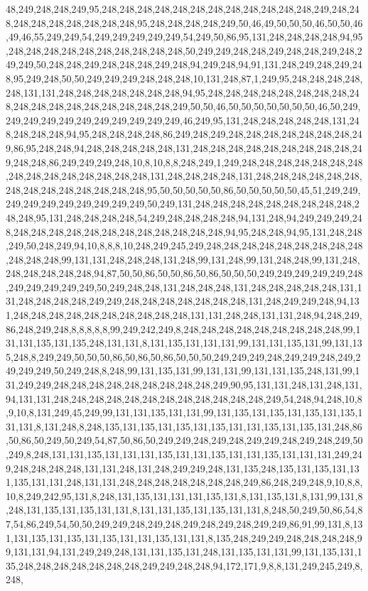 48,249,248,248,249,95,248,248,248,248,248,248,248,248,248,248,248,248,249,248,248,248,248,248,248,248,248,248,95,248,248,248,248,249,50,46,49,50,50,50,46,50,50,46,49,46,55,249,249,54,249,249,249,249,249,54,249,50,86,95,131,248,248,248,248,94,95,248,248,248,248,248,248,248,248,248,248,50,249,249,248,248,249,248,248,249,248,249,249,50,248,248,249,248,248,248,249,248,94,249,248,94,91,131,248,249,248,249,248,95,249,248,50,50,249,249,249,248,248,248,10,131,248,87,1,249,95,248,248,248,248,248,131,131,248,248,248,248,248,248,248,94,95,248,248,248,248,248,248,248,248,248,248,248,248,248,248,248,248,248,248,249,50,50,46,50,50,50,50,50,50,50,46,50,249,249,249,249,249,249,249,249,249,249,249,46,249,95,131,248,248,248,248,248,131,248,248,248,248,94,95,248,248,248,248,86,249,248,249,248,248,248,248,248,248,248,249,86,95,248,248,94,248,248,248,248,248,131,248,248,248,248,248,248,248,248,248,249,248,248,86,249,249,249,248,10,8,10,8,8,248,249,1,249,248,248,248,248,248,248,248,248,248,248,248,248,248,248,248,131,248,248,248,248,131,248,248,248,248,248,248,248,248,248,248,248,248,248,248,95,50,50,50,50,50,86,50,50,50,50,50,45,51,249,249,249,249,249,249,249,249,249,249,50,249,131,248,248,248,248,248,248,248,248,248,248,248,95,131,248,248,248,248,54,249,248,248,248,248,94,131,248,94,249,249,249,248,248,248,248,248,248,248,248,248,248,248,248,248,94,95,248,248,94,95,131,248,248,249,50,248,249,94,10,8,8,8,10,248,249,245,249,248,248,248,248,248,248,248,248,248,248,248,248,99,131,131,248,248,248,131,248,99,131,248,99,131,248,248,99,131,248,248,248,248,248,248,94,87,50,50,86,50,50,86,50,86,50,50,50,249,249,249,249,249,248,249,249,249,249,249,50,249,248,248,131,248,248,248,131,248,248,248,248,248,131,131,248,248,248,248,249,249,248,248,248,248,248,248,248,131,248,249,249,248,94,131,248,248,248,248,248,248,248,248,248,248,131,131,248,248,131,131,248,94,248,249,86,248,249,248,8,8,8,8,8,99,249,242,249,8,248,248,248,248,248,248,248,248,248,99,131,131,135,131,135,248,131,131,8,131,135,131,131,131,99,131,131,135,131,99,131,135,248,8,249,249,50,50,50,86,50,86,50,86,50,50,50,249,249,249,248,249,249,248,249,249,249,249,50,249,248,8,248,99,131,135,131,99,131,131,99,131,131,135,248,131,99,131,249,249,248,248,248,248,248,248,248,248,248,249,90,95,131,131,248,131,248,131,94,131,131,248,248,248,248,248,248,248,248,248,248,248,248,249,54,248,94,248,10,8,9,10,8,131,249,45,249,99,131,131,135,131,131,99,131,135,131,135,131,135,131,135,131,131,8,131,248,8,248,135,131,135,131,135,131,135,131,131,135,131,135,131,248,86,50,86,50,249,50,249,54,87,50,86,50,249,249,248,249,248,249,249,248,249,248,249,50,249,8,248,131,131,135,131,131,131,135,131,131,135,131,131,135,131,131,131,249,249,248,248,248,248,131,131,248,131,248,249,249,248,131,135,248,135,131,135,131,131,135,131,131,248,131,131,248,248,248,248,248,248,248,249,86,248,249,248,9,10,8,8,10,8,249,242,95,131,8,248,131,135,131,131,131,135,131,8,131,135,131,8,131,99,131,8,248,131,135,131,135,131,131,8,131,131,135,131,135,131,131,8,248,50,249,50,86,54,87,54,86,249,54,50,50,249,249,248,249,248,249,248,249,248,249,249,86,91,99,131,8,131,131,135,131,135,131,135,131,131,135,131,131,8,135,248,249,249,248,248,248,248,99,131,131,94,131,249,249,248,131,131,135,131,248,131,135,131,131,99,131,135,131,135,248,248,248,248,248,248,248,249,249,248,248,94,172,171,9,8,8,131,249,245,249,8,248,